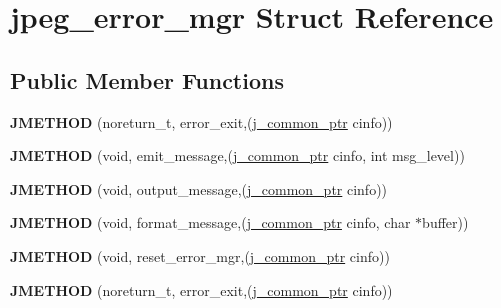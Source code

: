 \hypertarget{structjpeg__error__mgr}{}\section{jpeg\+\_\+error\+\_\+mgr Struct Reference}
\label{structjpeg__error__mgr}
\subsection*{Public Member Functions}
\begin{DoxyCompactItemize}
\item 
\mbox{\label{structjpeg__error__mgr_a72c40bceda2e6cb78046165e6892ac3a}} 
{\bfseries J\+M\+E\+T\+H\+OD} (noreturn\+\_\+t, error\+\_\+exit,(\hyperlink{structjpeg__common__struct}{j\+\_\+common\+\_\+ptr} cinfo))
\item 
\mbox{\label{structjpeg__error__mgr_a73c0a027b6e6cb8ff2b7b0fc42f756f9}} 
{\bfseries J\+M\+E\+T\+H\+OD} (void, emit\+\_\+message,(\hyperlink{structjpeg__common__struct}{j\+\_\+common\+\_\+ptr} cinfo, int msg\+\_\+level))
\item 
\mbox{\label{structjpeg__error__mgr_ac2989f8ef34acdd78ce26a9110a1c094}} 
{\bfseries J\+M\+E\+T\+H\+OD} (void, output\+\_\+message,(\hyperlink{structjpeg__common__struct}{j\+\_\+common\+\_\+ptr} cinfo))
\item 
\mbox{\label{structjpeg__error__mgr_a5f1dfb51c337c36ae1bc5fae7f84528f}} 
{\bfseries J\+M\+E\+T\+H\+OD} (void, format\+\_\+message,(\hyperlink{structjpeg__common__struct}{j\+\_\+common\+\_\+ptr} cinfo, char $\ast$buffer))
\item 
\mbox{\label{structjpeg__error__mgr_ac676478083167b3731995d7901bd4b6c}} 
{\bfseries J\+M\+E\+T\+H\+OD} (void, reset\+\_\+error\+\_\+mgr,(\hyperlink{structjpeg__common__struct}{j\+\_\+common\+\_\+ptr} cinfo))
\item 
\mbox{\label{structjpeg__error__mgr_a72c40bceda2e6cb78046165e6892ac3a}} 
{\bfseries J\+M\+E\+T\+H\+OD} (noreturn\+\_\+t, error\+\_\+exit,(\hyperlink{structjpeg__common__struct}{j\+\_\+common\+\_\+ptr} cinfo))
\item 

\end{DoxyCompactItemize}
